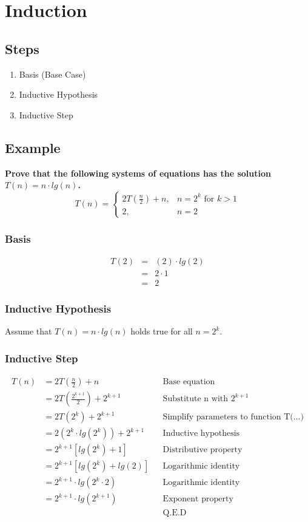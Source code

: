 \section{Induction}

\subsection*{Steps}
\begin{enumerate}
	\item Basis (Base Case)
	\item Inductive Hypothesis
	\item Inductive Step
\end{enumerate}

\subsection{Example}
\textbf{Prove that the following systems of equations has the solution $T(n) = n \cdot lg(n)$.}
$$
T(n) = \begin{cases}
	2T(\frac{n}{2}) + n, & n = 2^k \mbox{ for } k > 1\\
	2, & n = 2
\end{cases}
$$

\subsubsection*{Basis}
\begin{eqnarray*}
T(2) &=& (2) \cdot lg(2)\\
	&=& 2 \cdot 1\\
	&=& 2
\end{eqnarray*}

\subsubsection*{Inductive Hypothesis}
Assume that $T(n) = n \cdot lg(n)$ holds true for all $n = 2^k$.

\subsubsection*{Inductive Step}
\begin{align*}
T(n)	&=	2T(\frac{n}{2}) + n						&& \text{Base equation}\\
		&= 	2T(\frac{2^{k+1}}{2}) + 2^{k+1}			&& \text{Substitute n with } 2^{k+1}\\
		&= 	2T(2^{k}) + 2^{k+1}						&& \text{Simplify parameters to function T(...)}\\
		&=	2(2^k \cdot lg(2^k)) + 2^{k+1}			&& \text{Inductive hypothesis}\\
		&=	2^{k+1} \left[ lg(2^k) + 1 \right]		&& \text{Distributive property}\\
		&=  2^{k+1} \left[ lg(2^k) + lg(2) \right]  && \text{Logarithmic identity}\\
		&= 	2^{k+1} \cdot lg(2^k \cdot 2)			&& \text{Logarithmic identity}\\
		&=  2^{k+1} \cdot lg(2^{k+1})				&& \text{Exponent property}\\
		&											&& \text{Q.E.D}
\end{align*}

